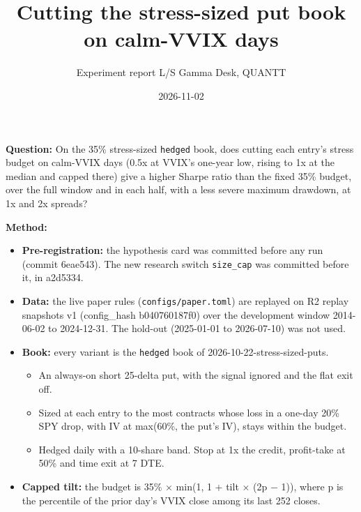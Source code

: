 \documentclass{article}
\title{Cutting the stress-sized put book on calm-VVIX days}
\author{Experiment report \textperiodcentered{} L/S Gamma Desk, QUANTT}
\date{2026-11-02}
\begin{document}
\maketitle

\textbf{Question:} On the 35\% stress-sized \texttt{hedged} book, does cutting each entry's stress budget on calm-VVIX days (0.5x at VVIX's one-year low, rising to 1x at the median and capped there) give a higher Sharpe ratio than the fixed 35\% budget, over the full window and in each half, with a less severe maximum drawdown, at 1x and 2x spreads?

\textbf{Method:}

\begin{itemize}

\item \textbf{Pre-registration:} the hypothesis card was committed before any run (commit 6eae543). The new research switch \texttt{size\_\allowbreak{}cap} was committed before it, in a2d5334.

\item \textbf{Data:} the live paper rules (\texttt{configs/\allowbreak{}paper.\allowbreak{}toml}) are replayed on R2 replay snapshots v1 (config\_hash b040760187f0) over the development window 2014-06-02 to 2024-12-31. The hold-out (2025-01-01 to 2026-07-10) was not used.

\item \textbf{Book:} every variant is the \texttt{hedged} book of 2026-10-22-stress-sized-puts.

\begin{itemize}

\item An always-on short 25-delta put, with the signal ignored and the flat exit off.

\item Sized at each entry to the most contracts whose loss in a one-day 20\% SPY drop, with IV at max(60\%, the put's IV), stays within the budget.

\item Hedged daily with a 10-share band. Stop at 1x the credit, profit-take at 50\% and time exit at 7 DTE.

\end{itemize}

\item \textbf{Capped tilt:} the budget is 35\% \ensuremath{\times} min(1, 1 + tilt \ensuremath{\times} (2p \ensuremath{-} 1)), where p is the percentile of the prior day's VVIX close among its last 252 closes.


\end{itemize}
\end{document}
